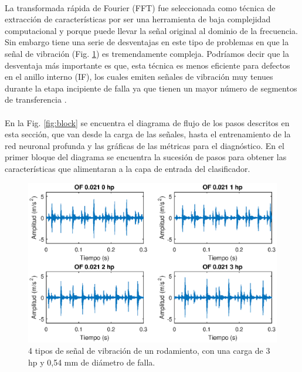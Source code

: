 \documentclass[12pt]{article}%
\begin{document}
\paragraph{}
La transformada rápida de Fourier (FFT) fue seleccionada como técnica de extracción de características por ser una herramienta de baja complejidad computacional y porque puede llevar la señal original al dominio de la frecuencia. Sin embargo tiene una serie de desventajas en este tipo de problemas en que la señal de vibración (Fig. \ref{fig:senales}) es tremendamente compleja. Podríamos decir que la desventaja más importante es que, esta técnica es menos eficiente para defectos en el anillo interno (IF), los cuales emiten señales de vibración muy tenues durante la etapa incipiente de falla ya que tienen un mayor número de segmentos de transferencia \cite{rai}. 

\paragraph{}
En la Fig. \ref{fig:block} se encuentra el diagrama de flujo de los pasos descritos en esta sección, que van desde la carga de las señales, hasta el entrenamiento de la red neuronal profunda y las gráficas de las métricas para el diagnóstico. En el primer bloque del diagrama se encuentra la sucesión de pasos para obtener las características que alimentaran a la capa de entrada del clasificador.

\begin{figure}[ht]
  \centering
    \includegraphics[scale=0.9]{./signalOF.eps}
  \caption{4 tipos de señal de vibración de un rodamiento, con una carga de 3 hp y 0,54 mm de diámetro de falla.}
  \label{fig:senales}
\end{figure}
\end{document}
